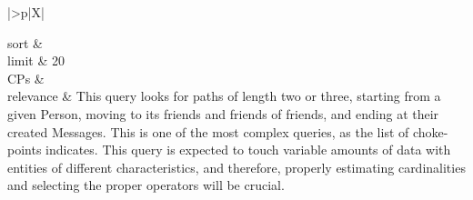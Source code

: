 \begin{tabularx}{\queryCardWidth}{|>{\queryPropertyCell}p{\queryPropertyCellWidth}|X|}
%
	
		sort		&
		\innerCardVSpace \\ \hline
	limit & 20 \\ \hline
	CPs &
	 \\ \hline
	relevance &
		\footnotesize This query looks for paths of length two or three, starting from a given Person, moving to its friends and friends of
friends, and ending at their created Messages. This is one of the most complex queries, as the list of choke-points
indicates. This query is expected to touch variable amounts of data with entities of different characteristics, and
therefore, properly estimating cardinalities and selecting the proper operators will be crucial.
 \\ \hline%
\end{tabularx}
\queryCardVSpace

\let\emph\oldemph